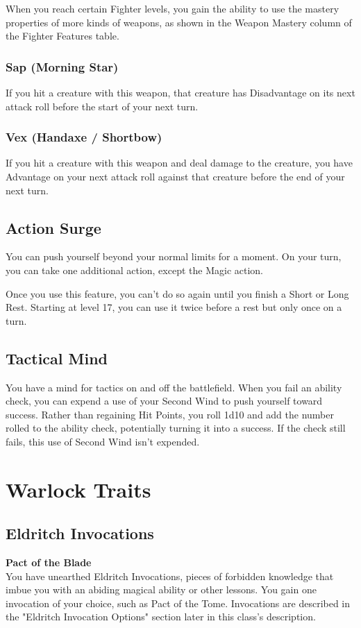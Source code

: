 \documentclass[letterpaper,openany,oneside,twocolumn]{book}
\begin{document}
When you reach certain Fighter levels, you gain the ability to use the mastery properties of more kinds of weapons, as shown in the Weapon Mastery column of the Fighter Features table.
\subsubsection*{Sap (Morning Star)}
If you hit a creature with this weapon, that creature has Disadvantage on its next attack roll before the start of your next turn.
\subsubsection*{Vex (Handaxe / Shortbow)}
If you hit a creature with this weapon and deal damage to the creature, you have Advantage on your next attack roll against that creature before the end of your next turn.
\subsection*{Action Surge}
You can push yourself beyond your normal limits for a moment. On your turn, you can take one additional action, except the Magic action.

Once you use this feature, you can't do so again until you finish a Short or Long Rest. Starting at level 17, you can use it twice before a rest but only once on a turn.
\subsection*{Tactical Mind}
You have a mind for tactics on and off the battlefield. When you fail an ability check, you can expend a use of your Second Wind to push yourself toward success. Rather than regaining Hit Points, you roll 1d10 and add the number rolled to the ability check, potentially turning it into a success. If the check still fails, this use of Second Wind isn't expended.

\section*{Warlock Traits}
\subsection*{Eldritch Invocations}
\textbf{Pact of the Blade}\\
You have unearthed Eldritch Invocations, pieces of forbidden knowledge that imbue you with an abiding magical ability or other lessons. You gain one invocation of your choice, such as Pact of the Tome. Invocations are described in the "Eldritch Invocation Options" section later in this class's description.
\end{document}
